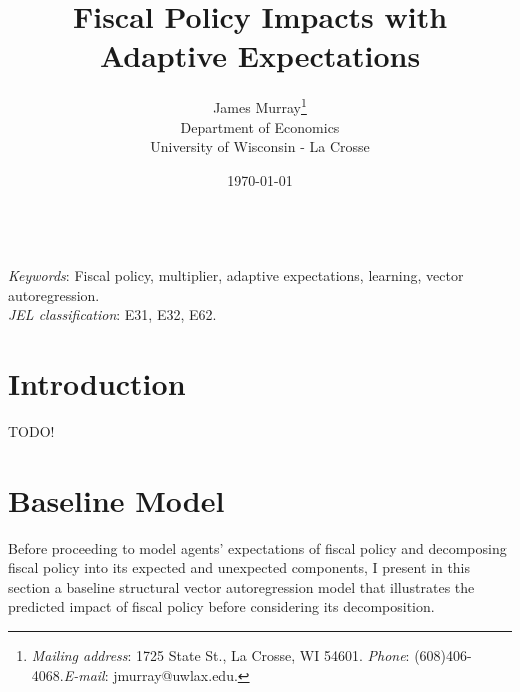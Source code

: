\documentclass[12pt]{article}
\begin{document}
\begin{titlepage}
\begin{singlespace}
\title{Fiscal Policy Impacts with Adaptive Expectations}
\date{\today}
\author{
James Murray\footnote{\textit{Mailing address}: 1725 State St., La Crosse, WI  54601. \textit{Phone}: (608)406-4068.\newline  \textit{E-mail}: jmurray@uwlax.edu.}\\Department of Economics\\University of Wisconsin - La Crosse
}

\maketitle

\thispagestyle{empty}

\\

\noindent \textit{Keywords}: Fiscal policy, multiplier, adaptive expectations, learning, vector autoregression. \\
\noindent \textit{JEL classification}: E31, E32, E62.
\end{singlespace}
\end{titlepage}

\section{Introduction}

TODO!

\section{Baseline Model}

Before proceeding to model agents' expectations of fiscal policy and decomposing fiscal policy into its expected and unexpected components, I present in this section a baseline structural vector autoregression model that illustrates the predicted impact of fiscal policy before considering its decomposition. 
\end{document}
